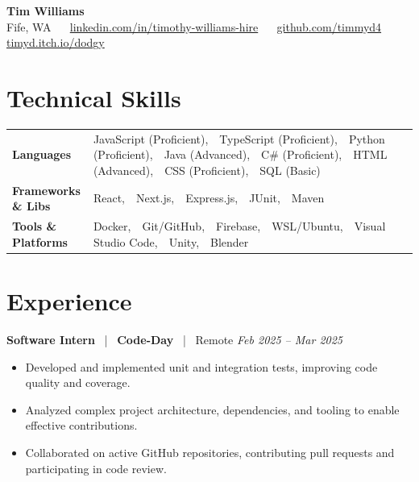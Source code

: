 \documentclass[10pt, letterpaper]{article}
\newcommand{\jobhead}[4]{%
  \vspace{5pt}%
  {\bfseries\color{dark}#1}%
  ~{\color{light}|}~%
  {\bfseries\color{navy}#2}%
  ~{\color{light}|}~%
  {\color{light}#3}%
  \hfill{\color{light}\small\textit{#4}}\\[-2pt]%
}
\newcommand{\skillrow}[2]{%
  {\bfseries #1} & #2 \\[2pt]%
}
\begin{document}

\begin{center}
  {\huge\bfseries\color{navy} Tim Williams}\\[4pt]
  {\small\color{light}
    Fife, WA
    ~\textbullet~
    \href{https://linkedin.com/in/timothy-williams-hire}{linkedin.com/in/timothy-williams-hire}
    ~\textbullet~
    \href{https://github.com/timmyd4}{github.com/timmyd4}
    ~\textbullet~
    \href{https://timyd.itch.io/dodgy}{timyd.itch.io/dodgy}
  }
\end{center}

\vspace{2pt}

\section{Technical Skills}

\begin{tabular}{@{}p{1.6in} p{5.2in}@{}}
  \skillrow{Languages}{JavaScript (Proficient),\ \ TypeScript (Proficient),\ \ Python (Proficient),\ \ Java (Advanced),\ \ C\# (Proficient),\ \ HTML (Advanced),\ \ CSS (Proficient),\ \ SQL (Basic)}
  \skillrow{Frameworks \& Libs}{React,\ \ Next.js,\ \ Express.js,\ \ JUnit,\ \ Maven}
  \skillrow{Tools \& Platforms}{Docker,\ \ Git/GitHub,\ \ Firebase,\ \ WSL/Ubuntu,\ \ Visual Studio Code,\ \ Unity,\ \ Blender}
\end{tabular}

\section{Experience}

\jobhead{Software Intern}{Code-Day}{Remote}{Feb 2025 – Mar 2025}
\begin{itemize}
  \item Developed and implemented unit and integration tests, improving code quality and coverage.
  \item Analyzed complex project architecture, dependencies, and tooling to enable effective contributions.
  \item Collaborated on active GitHub repositories, contributing pull requests and participating in code review.
\end{itemize}
\end{document}

